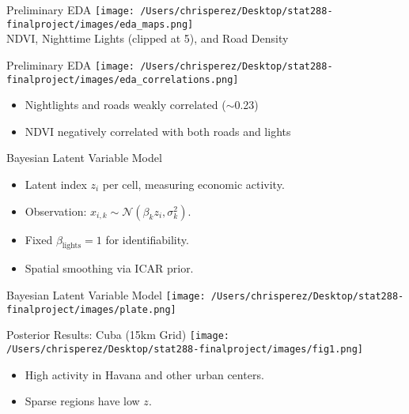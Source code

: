 \documentclass{beamer}
\begin{document}
\begin{frame}{Preliminary EDA}
  \centering
  \texttt{[image: /Users/chrisperez/Desktop/stat288-finalproject/images/eda\_maps.png]} \\[0.8em]
  \footnotesize NDVI, Nighttime Lights (clipped at 5), and Road Density
\end{frame}


\begin{frame}{Preliminary EDA}
  \centering
  \texttt{[image: /Users/chrisperez/Desktop/stat288-finalproject/images/eda\_correlations.png]} \\[1em]
  \scriptsize
  \begin{itemize}
    \item Nightlights and roads weakly correlated ($\sim$0.23)
    \item NDVI negatively correlated with both roads and lights
  \end{itemize}
\end{frame}



\begin{frame}{Bayesian Latent Variable Model}
  \begin{itemize}
    \item Latent index $z_i$ per cell, measuring economic activity.
    \item Observation: $x_{i,k} \sim \mathcal{N}(\beta_k z_i, \sigma_k^2)$.
    \item Fixed $\beta_{\text{lights}} = 1$ for identifiability.
    \item Spatial smoothing via ICAR prior.
  \end{itemize}
  \end{frame}
  
\begin{frame}{Bayesian Latent Variable Model}
\centering
\texttt{[image: /Users/chrisperez/Desktop/stat288-finalproject/images/plate.png]}
\end{frame}

\begin{frame}{Posterior Results: Cuba (15km Grid)}
  \centering
  \texttt{[image: /Users/chrisperez/Desktop/stat288-finalproject/images/fig1.png]}
  \begin{itemize}
    \item High activity in Havana and other urban centers.
    \item Sparse regions have low $z$.
  \end{itemize}
\end{frame}
\end{document}

